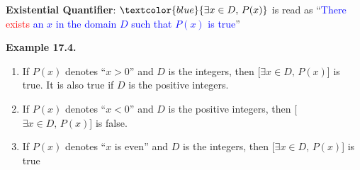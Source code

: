 \documentclass[aspectratio=169]{beamer}
\providecommand{\Blue}[1]{\textcolor{blue}{#1}}
\providecommand{\Red}[1]{\textcolor{red}{#1}}
\begin{document}
\iffalse %
\begin{frame}[plain]{ }

 {\bf Example 17.4}. Let $P(x)$ be the statement $x+1>x$.
   Is this true for all integers $x$? A python code for this problem is
   \pause
   
    \begin{center}
      \texttt{[image: lecture15-fig2.png]}
    \end{center}

\end{frame}
\fi  %

\begin{frame}[plain]{ }
  
     
   {\bf Existential Quantifier}: 
      $\Blue{\exists x\in D,\, P(x)}$ is read as ``\Blue{There \Red{exists} an $x$ in the domain $D$
      such that $P(x)$ is true}'' 
      \medskip
      
    {\bf Example 17.4.}
     \begin{enumerate}[<+->]
      \item If $P(x)$ denotes ``$x>0$'' and $D$ is the integers, then 
         [$\exists x\in D,\, P(x)$] is true. It is also true if $D$ is the positive integers.
      \item If $P(x)$ denotes ``$x<0$'' and $D$ is the positive integers, then 
         [$\exists x\in D,\, P(x)$] is false.
      \item If $P(x)$ denotes ``$x$ is even'' and $D$ is the integers, then 
         [$\exists x\in D,\, P(x)$] is true
     \end{enumerate}
\end{frame}


\iffalse%
\begin{frame}[plain]{}

  {\bf Example 17.6}. Let $P(x)$ be the statement $x^2=4$. 
  Is this true for at least one integer $x$? A python code for this problem is
  
  
  \begin{center}
      \texttt{[image: lecture15-fig3.png]}
    \end{center}
  
\end{frame}
\fi%

  
\end{document}
